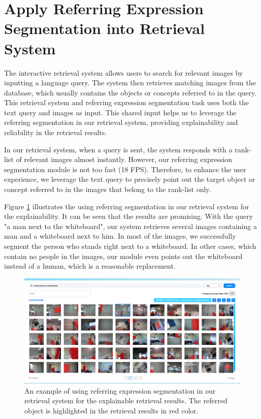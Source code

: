 \section{Apply Referring Expression Segmentation into Retrieval System}
The interactive retrieval system allows users to search for relevant images by inputting a language query. The system then retrieves matching images from the database, which usually contains the objects or concepts referred to in the query. This retrieval system and referring expression segmentation task uses both the text query and images as input. This shared input helps us to leverage the referring segmentation in our retrieval system, providing explainability and reliability in the retrieval results.

In our retrieval system, when a query is sent, the system responds with a rank-list of relevant images almost instantly. However, our referring expression segmentation module is not too fast (18 FPS). Therefore, to enhance the user experience, we leverage the text query to precisely point out the target object or concept referred to in the images that belong to the rank-list only.

Figure \ref{fig:res_retrieval_system} illustrates the using referring segmentation in our retrieval system for the explainability. It can be seen that the results are promising. With the query "a man next to the whiteboard", our system retrieves several images containing a man and a whiteboard next to him.
In most of the images, we successfully segment the person who stands right next to a whiteboard. In other cases, which contain no people in the images, our module even points out the whiteboard instead of a human, which is a reasonable replacement.


\begin{figure}[!t]
    \centering
    \includegraphics[width=0.8\linewidth]{content/resources/images/referring_segmentation/ReferringSegmentationInRetrievalSystem.png}
    \caption{An example of using referring expression segmentation in our retrieval system for the explainable retrieval results. The referred object is highlighted in the retrieval results in red color.}
    \label{fig:res_retrieval_system}
\end{figure}

